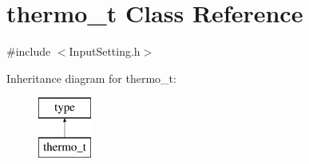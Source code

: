 \hypertarget{classthermo__t}{\section{thermo\-\_\-t Class Reference}
\label{classthermo__t}
}


{\ttfamily \#include $<$Input\-Setting.\-h$>$}

Inheritance diagram for thermo\-\_\-t\-:\begin{figure}[H]
\begin{center}
\leavevmode
\includegraphics[height=2.000000cm]{classthermo__t}
\end{center}
\end{figure}
